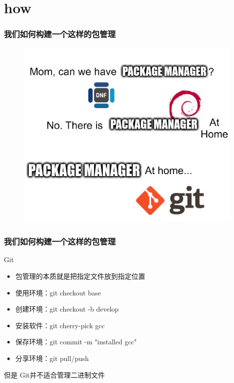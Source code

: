 \documentclass{ctexbeamer}
\begin{document}
\section{how}
\begin{frame}
  \frametitle{我们如何构建一个这样的包管理}
  \begin{figure}
    \includegraphics[width=0.8\linewidth]{./meme.jpg}
  \end{figure}
\end{frame}

\begin{frame}
  \frametitle{我们如何构建一个这样的包管理}
  \begin{exampleblock}{Git}
    \begin{itemize}
      \item 包管理的本质就是把指定文件放到指定位置
      \item 使用环境：git checkout base
      \item 创建环境：git checkout -b develop
      \item 安装软件：git cherry-pick gcc
      \item 保存环境：git commit -m "installed gcc"
      \item 分享环境：git pull/push
    \end{itemize}
  \end{exampleblock}
  \begin{alertblock}{但是}
    Git并不适合管理二进制文件
  \end{alertblock}
\end{frame}
\end{document}

